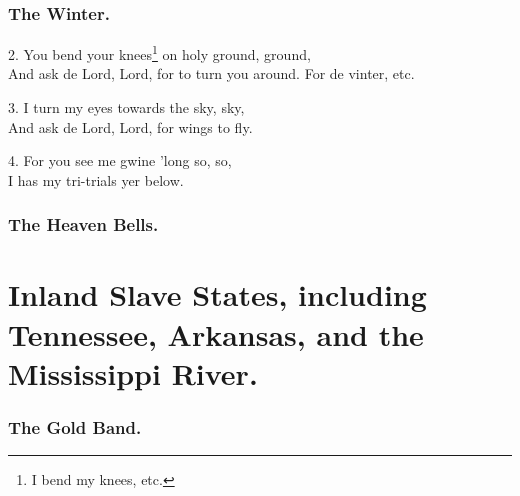 \documentclass[a5paper,10pt]{book}
\begin{document}
\begin{extra}
\end{extra}


\newpage
\section{The Winter.}
\thispagestyle{empty}

\begin{song}

\end{song}

\begin{stanza}
\item[2.]
  You bend your knees\footnote[3]{I bend my knees, etc.} on holy ground, ground,\\
  And ask de Lord, Lord, for to turn you around.
  For de vinter, etc.
\item[3.]
  I turn my eyes towards the sky, sky,\\
  And ask de Lord, Lord, for wings to fly.
\item[4.]
  For you see me gwine 'long so, so,\\
  I has my tri-trials yer below.
\end{stanza}


\newpage
\section{The Heaven Bells.}
\thispagestyle{empty}

\begin{song}
\end{song}


\newpage
\thispagestyle{empty}


\part{Inland Slave States, including Tennessee, Arkansas,
  and the Mississippi River.}
\thispagestyle{empty}


\newpage
\section{The Gold Band.}
\thispagestyle{empty}
\end{document}
